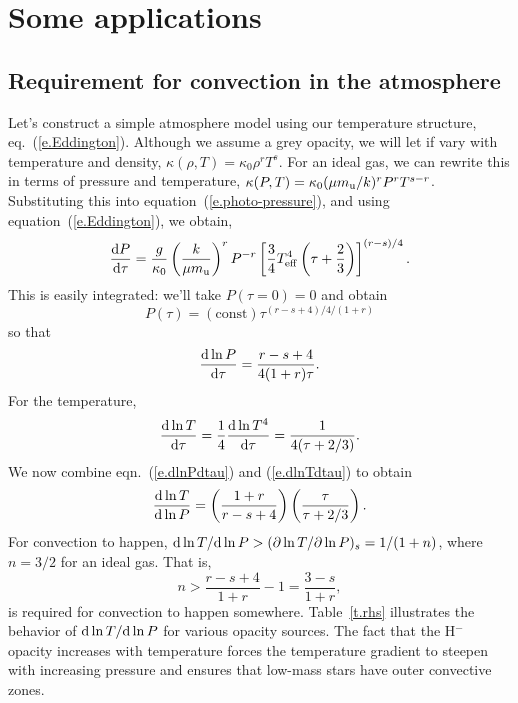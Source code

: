 \section{Some applications}

\subsection{Requirement for convection in the atmosphere}\label{s.atmosphere-convection}

Let's construct a simple atmosphere model using our temperature structure, eq.~(\ref{e.Eddington}).  Although we assume a grey opacity, we will let if vary with temperature and density, $\kappa(\rho,T) = \kappa_{0}\rho^{r}T^{s}$.  For an ideal gas, we can rewrite this in terms of pressure and temperature, $\kappa(P,T) = \kappa_{0} (\mu m_\mathrm{u}/k)^{r}P^{r} T^{s-r}$.  Substituting this into equation~(\ref{e.photo-pressure}), and using equation~(\ref{e.Eddington}), we obtain,
\[
  \frac{\mathrm{d} P}{\mathrm{d} \tau} = \frac{g}{\kappa_{0}}\left(\frac{k}{\mu m_\mathrm{u}}\right)^{r} P^{-r} \left[\frac{3}{4}T_{\mathrm{eff}}^{4}\left(\tau + \frac{2}{3}\right)\right]^{(r-s)/4}.
\]
This is easily integrated: we'll take $P(\tau = 0) = 0$ and obtain
\[
  P(\tau) = (\mathrm{const})\tau^{(r-s+4)/4/(1+r)}
\]
so that
\begin{equation}\label{e.dlnPdtau}
  \frac{\mathrm{d} \ln P}{\mathrm{d} \tau} = \frac{r-s+4}{4(1+r)\tau}.
\end{equation}
For the temperature,
\begin{equation}\label{e.dlnTdtau}
 \frac{\mathrm{d}\ln T}{\mathrm{d}\tau} = \frac{1}{4}\frac{\mathrm{d}\ln T^{4}}{\mathrm{d} \tau} = \frac{1}{4(\tau + 2/3)}.
\end{equation}
We now combine eqn.~(\ref{e.dlnPdtau}) and (\ref{e.dlnTdtau}) to obtain
\begin{equation}\label{e.dlnTdlnP-atmosphere}
\frac{\mathrm{d} \ln T}{\mathrm{d}\ln P} = \left(\frac{1+r}{r-s +4}\right)\left(\frac{\tau}{\tau + 2/3}\right).
\end{equation}
For convection to happen, $\mathrm{d}\ln T/\mathrm{d}\ln P > (\partial\ln T/\partial\ln P)_{s} = 1/(1+n)$, where $n = 3/2$ for an ideal gas.  That is,
\begin{equation}\label{e.convection-will-happen}
 n > \frac{r-s + 4}{1+r} - 1 = \frac{3-s}{1+r},
\end{equation}
is required for convection to happen somewhere.  Table~\ref{t.rhs} illustrates the behavior of $\mathrm{d}\ln T/\mathrm{d}\ln P$ for various opacity sources.  The fact that the H$^{-}$ opacity increases with temperature forces the temperature gradient to steepen with increasing pressure and ensures that low-mass stars have outer convective zones.

